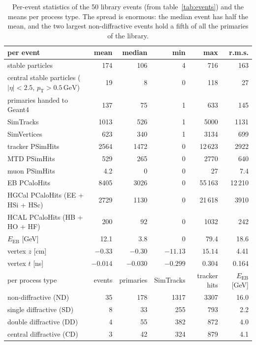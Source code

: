 \documentclass[11pt,a4paper]{article}
\newcommand{\pt}{\ensuremath{p_{\mathrm{T}}}}
\newcommand{\GeV}{\,\mathrm{GeV}}
\begin{document}
\begin{table}[H]
\centering\small
\caption{Per-event statistics of the 50 library events (from table~\ref{tab:events}) and the means per
process type. The spread is enormous: the median event has half the mean, and the two largest
non-diffractive events hold a fifth of all the primaries of the library.}
\label{tab:stats}
\footnotesize
\begin{tabular}{lrrrrr}
\toprule
per event & mean & median & min & max & r.m.s. \\
\midrule
stable particles & 174 & 106 & 4 & 716 & 163 \\
central stable particles ($|\eta|<2.5$, $\pt>0.5\GeV$) & 19 & 8 & 0 & 118 & 27 \\
primaries handed to Geant4 & 137 & 75 & 1 & 633 & 145 \\
SimTracks & 1013 & 526 & 1 & 5000 & 1131 \\
SimVertices & 623 & 340 & 1 & 3134 & 699 \\
tracker PSimHits & 2564 & 1472 & 0 & 12\,623 & 2922 \\
MTD PSimHits & 529 & 265 & 0 & 2770 & 640 \\
muon PSimHits & 4.2 & 0 & 0 & 27 & 7.4 \\
EB PCaloHits & 8405 & 3026 & 0 & 55\,163 & 12\,210 \\
HGCal PCaloHits (EE + HSi + HSc) & 2729 & 1130 & 0 & 21\,618 & 3910 \\
HCAL PCaloHits (HB + HO + HF) & 200 & 92 & 0 & 1032 & 242 \\
$E_{\mathrm{EB}}$ [GeV] & 12.1 & 3.8 & 0 & 79.4 & 18.6 \\
vertex $z$ [cm] & $-0.33$ & $-0.30$ & $-11.13$ & $15.14$ & 4.41 \\
vertex $t$ [ns] & $-0.014$ & $-0.030$ & $-0.299$ & $0.304$ & 0.164 \\
\midrule
per process type & events & primaries & SimTracks & tracker hits & $E_{\mathrm{EB}}$ [GeV] \\
\midrule
non-diffractive (ND) & 35 & 178 & 1317 & 3307 & 16.0 \\
single diffractive (SD) & 8 & 33 & 255 & 793 & 2.2 \\
double diffractive (DD) & 4 & 55 & 382 & 872 & 4.0 \\
central diffractive (CD) & 3 & 42 & 324 & 879 & 4.1 \\
\bottomrule
\end{tabular}
\end{table}
\end{document}

